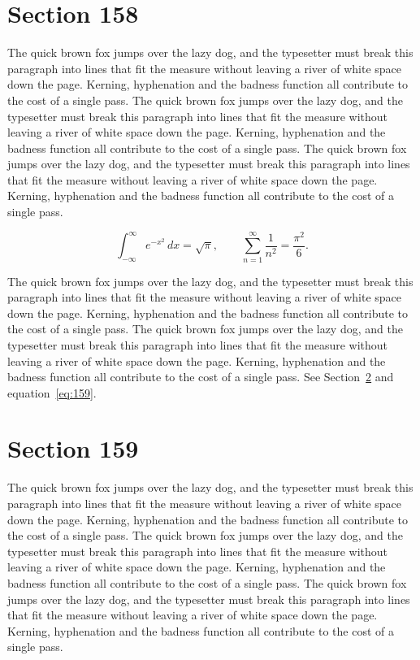\documentclass{article}
\begin{document}
\section{Section 158}
\label{sec:158}
The quick brown fox jumps over the lazy dog, and the typesetter must break this paragraph into lines that fit the measure without leaving a river of white space down the page. Kerning, hyphenation and the badness function all contribute to the cost of a single pass. The quick brown fox jumps over the lazy dog, and the typesetter must break this paragraph into lines that fit the measure without leaving a river of white space down the page. Kerning, hyphenation and the badness function all contribute to the cost of a single pass. The quick brown fox jumps over the lazy dog, and the typesetter must break this paragraph into lines that fit the measure without leaving a river of white space down the page. Kerning, hyphenation and the badness function all contribute to the cost of a single pass. 

\begin{equation}\label{eq:158}
\int_{-\infty}^{\infty} e^{-x^{2}}\,dx = \sqrt{\pi}, \qquad
\sum_{n=1}^{\infty} \frac{1}{n^{2}} = \frac{\pi^{2}}{6}.
\end{equation}

The quick brown fox jumps over the lazy dog, and the typesetter must break this paragraph into lines that fit the measure without leaving a river of white space down the page. Kerning, hyphenation and the badness function all contribute to the cost of a single pass. The quick brown fox jumps over the lazy dog, and the typesetter must break this paragraph into lines that fit the measure without leaving a river of white space down the page. Kerning, hyphenation and the badness function all contribute to the cost of a single pass. 
See Section~\ref{sec:159} and equation~\eqref{eq:159}.
\section{Section 159}
\label{sec:159}
The quick brown fox jumps over the lazy dog, and the typesetter must break this paragraph into lines that fit the measure without leaving a river of white space down the page. Kerning, hyphenation and the badness function all contribute to the cost of a single pass. The quick brown fox jumps over the lazy dog, and the typesetter must break this paragraph into lines that fit the measure without leaving a river of white space down the page. Kerning, hyphenation and the badness function all contribute to the cost of a single pass. The quick brown fox jumps over the lazy dog, and the typesetter must break this paragraph into lines that fit the measure without leaving a river of white space down the page. Kerning, hyphenation and the badness function all contribute to the cost of a single pass. 
\end{document}
